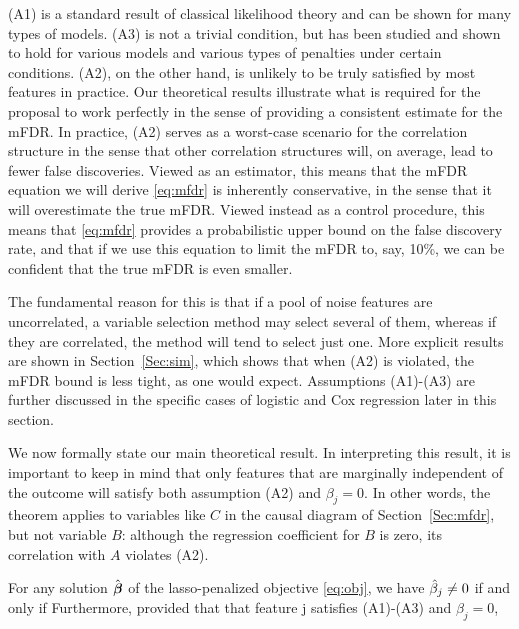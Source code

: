 (A1) is a standard result of classical likelihood theory and can be shown for many types of models.  (A3) is not a trivial condition, but has been studied and shown to hold for various models and various types of penalties under certain conditions.  (A2), on the other hand, is unlikely to be truly satisfied by most features in practice.
Our theoretical results illustrate what is required for the proposal to work perfectly in the sense of providing a consistent estimate for the mFDR.
In practice, (A2) serves as a worst-case scenario for the correlation structure in the sense that other correlation structures will, on average, lead to fewer false discoveries.
Viewed as an estimator, this means that the mFDR equation we will derive \eqref{eq:mfdr} is inherently conservative, in the sense that it will overestimate the true mFDR.
Viewed instead as a control procedure, this means that \eqref{eq:mfdr} provides a probabilistic upper bound on the false discovery rate, and that if we use this equation to limit the mFDR to, say, 10\%, we can be confident that the true mFDR is even smaller.

The fundamental reason for this is that if a pool of noise features are uncorrelated, a variable selection method may select several of them, whereas if they are correlated, the method will tend to select just one.  More explicit results are shown in Section~\ref{Sec:sim}, which shows that when (A2) is violated, the mFDR bound is less tight, as one would expect.
Assumptions (A1)-(A3) are further discussed in the specific cases of logistic and Cox regression later in this section.

We now formally state our main theoretical result.  In interpreting this result, it is important to keep in mind that only features that are marginally independent of the outcome will satisfy both assumption (A2) and $\beta_j=0$.
In other words, the theorem applies to variables like $C$ in the causal diagram of Section~\ref{Sec:mfdr}, but not variable $B$: although the regression coefficient for $B$ is zero, its correlation with $A$ violates (A2).

\begin{theorem}
  \label{Thm:main}
  For any solution $\hat{\boldsymbol{\beta}}$ of the lasso-penalized objective \eqref{eq:obj}, we have $\hat{\beta}_j \neq 0$ if and only if
  Furthermore, provided that that feature j satisfies (A1)-(A3) and $\beta_j=0$,
\end{theorem}


